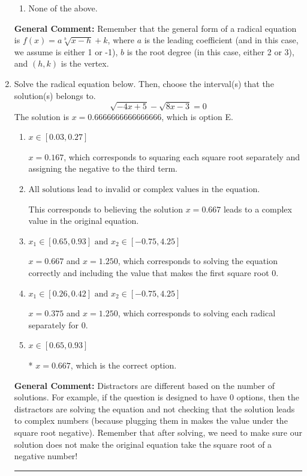 \documentclass{extbook}[14pt]
\newcommand{\litem}[1]{\item #1

\rule{\textwidth}{0.4pt}}
\begin{document}
\begin{enumerate}
{\begin{enumerate}[label=\Alph*.]
\item None of the above.\end{enumerate}
\textbf{General Comment:} Remember that the general form of a radical equation is $ f(x) = a \sqrt[b]{x - h} + k $, where $a$ is the leading coefficient (and in this case, we assume is either 1 or -1), $b$ is the root degree (in this case, either 2 or 3), and $(h, k)$ is the vertex.
}
\litem{
Solve the radical equation below. Then, choose the interval(s) that the solution(s) belongs to.
\[ \sqrt{-4 x + 5} - \sqrt{8 x - 3} = 0 \]The solution is \( x = 0.6666666666666666 \), which is option E.\begin{enumerate}[label=\Alph*.]
\item \( x \in [0.03,0.27] \)

$x = 0.167$, which corresponds to squaring each square root separately and assigning the negative to the third term.
\item \( \text{All solutions lead to invalid or complex values in the equation.} \)

This corresponds to believing the solution $x = 0.667$ leads to a complex value in the original equation.
\item \( x_1 \in [0.65, 0.93] \text{ and } x_2 \in [-0.75,4.25] \)

$x = 0.667$ and $x = 1.250$, which corresponds to solving the equation correctly and including the value that makes the first square root 0.
\item \( x_1 \in [0.26, 0.42] \text{ and } x_2 \in [-0.75,4.25] \)

$x = 0.375$ and $x = 1.250$, which corresponds to solving each radical separately for 0.
\item \( x \in [0.65,0.93] \)

* $x = 0.667$, which is the correct option.
\end{enumerate}

\textbf{General Comment:} Distractors are different based on the number of solutions. For example, if the question is designed to have 0 options, then the distractors are solving the equation and not checking that the solution leads to complex numbers (because plugging them in makes the value under the square root negative). Remember that after solving, we need to make sure our solution does not make the original equation take the square root of a negative number!
}
\end{enumerate}
\end{document}
